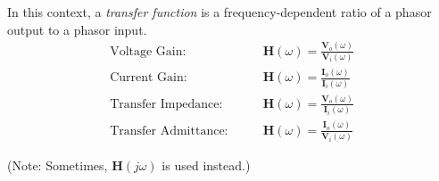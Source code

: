 \begin{multicols}{2}
\begin{CheatsheetEntryFrame}
        In this context, a \textit{transfer function} is a frequency-dependent ratio of a phasor output to a phasor input.
        \begin{align*}
            \text{Voltage Gain:}        \qquad & \mathbf{H}(\omega) = \frac{\mathbf{V}_o(\omega)}{\mathbf{V}_i(\omega)} \\
            \text{Current Gain:}        \qquad & \mathbf{H}(\omega) = \frac{\mathbf{I}_o(\omega)}{\mathbf{I}_i(\omega)} \\
            \text{Transfer Impedance:}  \qquad & \mathbf{H}(\omega) = \frac{\mathbf{V}_o(\omega)}{\mathbf{I}_i(\omega)} \\
            \text{Transfer Admittance:} \qquad & \mathbf{H}(\omega) = \frac{\mathbf{I}_o(\omega)}{\mathbf{V}_i(\omega)}
        \end{align*}

        (Note: Sometimes, $\mathbf{H}(j\omega)$ is used instead.)

    \end{CheatsheetEntryFrame}

\end{multicols}

